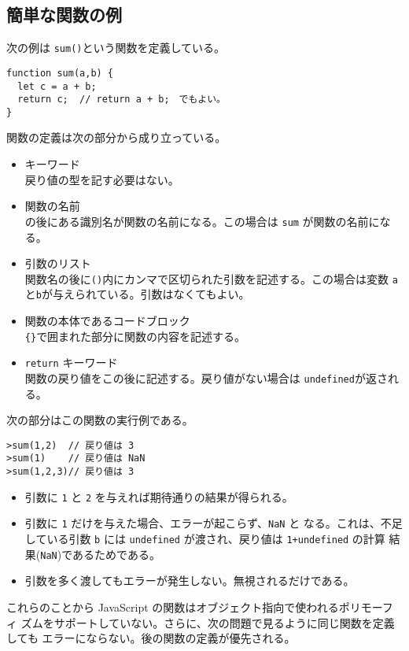 \subsection{簡単な関数の例}
次の例は \Verb+sum()+という関数を定義している。
\begin{Verbatim}
function sum(a,b) {
  let c = a + b;
  return c;  // return a + b;　でもよい。
}
\end{Verbatim}
関数の定義は次の部分から成り立っている。
\begin{itemize}
 \item {}キーワード\\
戻り値の型を記す必要はない。
 \item 関数の名前\\
 の後にある識別名が関数の名前になる。この場合は \texttt{sum}
       が関数の名前になる。
 \item 引数のリスト\\
関数名の後に\Verb+()+内にカンマで区切られた引数を記述する。この場合は変数
       \Verb+a+と\Verb+b+が与えられている。引数はなくてもよい。
 \item 関数の本体であるコードブロック\\
\Verb+{}+で囲まれた部分に関数の内容を記述する。
\item \Verb+return+ キーワード\\
関数の戻り値をこの後に記述する。戻り値がない場合は
       \Verb+undefined+が返される。
\end{itemize}
次の部分はこの関数の実行例である。
\begin{Verbatim}
>sum(1,2)  // 戻り値は 3
>sum(1)    // 戻り値は NaN
>sum(1,2,3)// 戻り値は 3
\end{Verbatim} 
\begin{itemize}
 \item 引数に \Verb+1+ と \Verb+2+ を与えれば期待通りの結果が得られる。
 \item 引数に \Verb+1+ だけを与えた場合、エラーが起こらず、\Verb+NaN+ と
       なる。これは、不足している引数 \Verb+b+ には
       \Verb+undefined+ が渡され、戻り値は \Verb-1+undefined- の計算
       結果(\Verb+NaN+)であるためである。
 \item 引数を多く渡してもエラーが発生しない。無視されるだけである。
\end{itemize}
これらのことから JavaScript の関数はオブジェクト指向で使われるポリモーフィ
ズムをサポートしていない。さらに、次の問題で見るように同じ関数を定義しても
エラーにならない。後の関数の定義が優先される。

